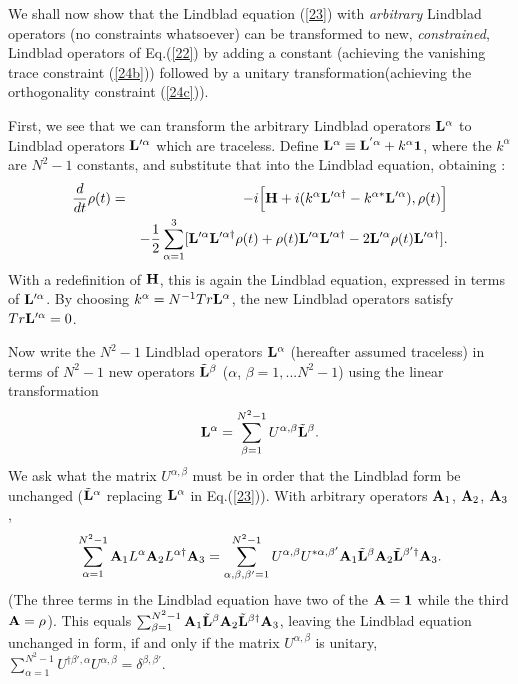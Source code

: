 \documentclass[aps,pra,amssymb, amsfonts,amsmath,showpacs, superscriptaddress,12pt]{revtex4}
\begin{document}
 We shall now show that the Lindblad equation (\ref{23}) with \textit{arbitrary} Lindblad operators (no constraints whatsoever)  can be transformed to new, \textit{constrained},  Lindblad operators of Eq.(\ref{22}) by adding a constant (achieving the vanishing trace constraint  (\ref{24b})) followed by a unitary transformation(achieving the orthogonality constraint  (\ref{24c})).
 
 
First, we see that we can transform the arbitrary Lindblad operators ${\bf L}^{\alpha}$ to Lindblad operators ${\bf L}'^{\alpha}$ which are traceless.   Define ${\bf L}^{\alpha}\equiv{\bf L}^{'\alpha}+k^{\alpha}{\bf 1}$, where the $k^{\alpha}$ are $N^{2}-1$ constants,  and substitute that into the Lindblad equation, obtaining :
 \begin{eqnarray}
\frac{d}{dt}{\bf\rho}(t)&=&-i\Big[{\bf H}+i(k^{\alpha}{\bf L}'^{\alpha\dagger}-k^{\alpha*}{\bf L}'^{\alpha}), {\bf\rho}(t)\Big]\nonumber\\
&&-\frac{1}{2}\sum_{\alpha=1}^{3}[{\bf L}'^{\alpha}{\bf L}'^{\alpha\dagger} {\bf\rho}(t)+ {\bf\rho}(t){\bf L}'^{\alpha}{\bf L}'^{\alpha\dagger}-2{\bf L}'^{\alpha}{\bf\rho}(t){\bf L}'^{\alpha\dagger}].\nonumber
 \end{eqnarray}
\noindent With a redefinition of ${\bf H}$, this is again the Lindblad equation, expressed in terms of ${\bf L}'^{\alpha}$. By choosing $k^{\alpha}=N^{-1}Tr{\bf L}^{\alpha}$, the new Lindblad operators satisfy $Tr{\bf L}'^{\alpha}=0$.  

Now write the $N^{2}-1$ Lindblad operators ${\bf L}^{\alpha}$  (hereafter assumed traceless) in terms of $N^{2}-1$ new operators $\tilde{\bf L}^{\beta}$ ($\alpha$, $\beta =1,... N^{2}-1$) using the linear transformation
\begin{equation}\label{25}
{\bf L}^{\alpha}=\sum_{\beta=1}^{N^{2}-1}U^{\alpha, \beta}\tilde{\bf L}^{\beta}.
\end{equation}
\noindent We ask what the matrix $U^{\alpha, \beta}$ must be in order that the Lindblad form be unchanged ($\tilde{\bf L}^{\alpha}$ replacing ${\bf L}^{\alpha}$  
in Eq.(\ref{23})).  With arbitrary  operators ${\bf A}_{1}$, ${\bf A}_{2}$, ${\bf A}_{3}$,  
\[
\sum_{\alpha=1}^{N^{2}-1}{\bf A}_{1}L^{\alpha}{\bf A}_{2}L^{\alpha\dagger}{\bf A}_{3}=\sum_{\alpha,\beta, \beta'=1}^{N^{2}-1}U^{\alpha, \beta}U^{*\alpha, \beta'}{\bf A}_{1}\tilde{\bf L}^{\beta}{\bf A}_{2}
\tilde{\bf  L}^{\beta'\dagger}{\bf A}_{3}.
\]
\noindent (The three terms in the Lindblad equation have two of the ${\bf A}={\bf 1}$ while the third  ${\bf A}={\bf \rho}$).  This  equals $\sum_{\beta=1}^{N^{2}-1}{\bf A}_{1}\tilde{\bf L}^{\beta}{\bf A}_{2}\tilde{\bf L}^{\beta\dagger}{\bf A}_{3}$, leaving  
the Lindblad equation unchanged in form, if and only if the  matrix $U^{\alpha, \beta}$ is unitary, $\sum_{\alpha=1}^{N^{2}-1}U^{\dagger\beta', \alpha}U^{\alpha, \beta}=\delta^{\beta,\beta'}$.
\end{document}
